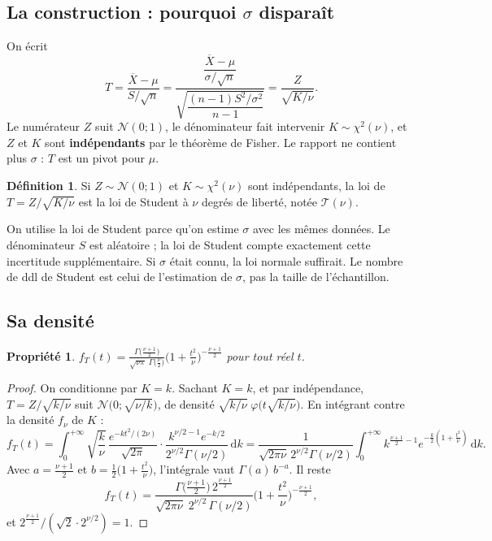 \documentclass[11pt,a4paper]{article}
\theoremstyle{sj}
\newtheorem{prop}[thm]{Propriété}
\theoremstyle{definition}
\newtheorem{defi}{Définition}
\theoremstyle{remark}
\newcommand{\N}{\mathcal{N}}
\newcommand{\Xb}{\overline{X}}
\newcommand{\dd}{\,\mathrm{d}}
\newcommand{\chid}{\chi^2}
\begin{document}
\subsection{La construction : pourquoi $\sigma$ disparaît}

On écrit
\[
T=\frac{\Xb-\mu}{S/\sqrt n}=\frac{\dfrac{\Xb-\mu}{\sigma/\sqrt n}}{\sqrt{\dfrac{(n-1)S^2/\sigma^2}{n-1}}}=\frac{Z}{\sqrt{K/\nu}}.
\]
Le numérateur $Z$ suit $\N(0;1)$, le dénominateur fait intervenir $K\sim\chid(\nu)$, et $Z$ et $K$ sont \textbf{indépendants} par le théorème de Fisher. Le rapport ne contient plus $\sigma$ : $T$ est un pivot pour $\mu$.

\begin{defi}
Si $Z\sim\N(0;1)$ et $K\sim\chid(\nu)$ sont indépendants, la loi de $T=Z/\sqrt{K/\nu}$ est la loi de Student à $\nu$ degrés de liberté, notée $\mathcal T(\nu)$.
\end{defi}

\begin{essentiel}
On utilise la loi de Student parce qu'on estime $\sigma$ avec les mêmes données. Le dénominateur $S$ est aléatoire ; la loi de Student compte exactement cette incertitude supplémentaire. Si $\sigma$ était connu, la loi normale suffirait. Le nombre de ddl de Student est celui de l'estimation de $\sigma$, pas la taille de l'échantillon.
\end{essentiel}

\subsection{Sa densité}

\begin{prop}
$\displaystyle f_T(t)=\frac{\Gamma\big(\frac{\nu+1}{2}\big)}{\sqrt{\nu\pi}\;\Gamma\big(\frac\nu2\big)}\Big(1+\frac{t^2}{\nu}\Big)^{-\frac{\nu+1}{2}}$ pour tout réel $t$.
\end{prop}

\begin{proof}
On conditionne par $K=k$. Sachant $K=k$, et par indépendance, $T=Z/\sqrt{k/\nu}$ suit $\N\big(0;\sqrt{\nu/k}\big)$, de densité $\sqrt{k/\nu}\;\varphi\big(t\sqrt{k/\nu}\big)$. En intégrant contre la densité $f_\nu$ de $K$ :
\[
f_T(t)=\int_0^{+\infty}\sqrt{\frac k\nu}\,\frac{e^{-kt^2/(2\nu)}}{\sqrt{2\pi}}\cdot\frac{k^{\nu/2-1}e^{-k/2}}{2^{\nu/2}\Gamma(\nu/2)}\dd k
=\frac{1}{\sqrt{2\pi\nu}\,2^{\nu/2}\Gamma(\nu/2)}\int_0^{+\infty}k^{\frac{\nu+1}{2}-1}e^{-\frac k2\left(1+\frac{t^2}{\nu}\right)}\dd k.
\]
Avec $a=\frac{\nu+1}{2}$ et $b=\frac12\big(1+\frac{t^2}{\nu}\big)$, l'intégrale vaut $\Gamma(a)\,b^{-a}$. Il reste
\[
f_T(t)=\frac{\Gamma\big(\frac{\nu+1}{2}\big)\,2^{\frac{\nu+1}{2}}}{\sqrt{2\pi\nu}\;2^{\nu/2}\,\Gamma(\nu/2)}\Big(1+\frac{t^2}{\nu}\Big)^{-\frac{\nu+1}{2}},
\]
et $2^{\frac{\nu+1}{2}}/(\sqrt2\cdot2^{\nu/2})=1$.
\end{proof}
\end{document}
